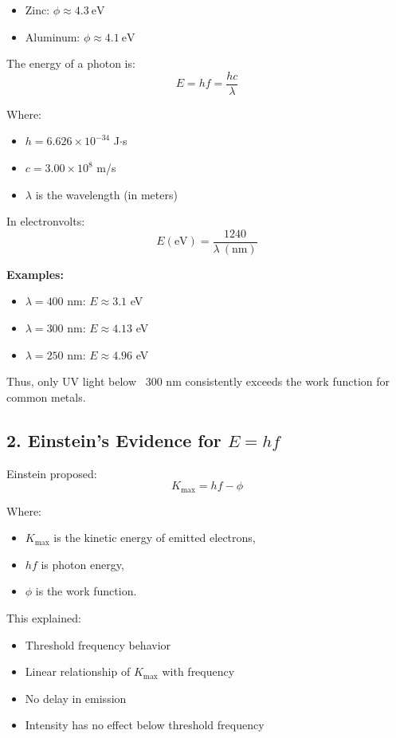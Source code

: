\documentclass[12pt]{article}
\begin{document}
\begin{itemize}
    \item Zinc: $\phi \approx 4.3\ \text{eV}$
    \item Aluminum: $\phi \approx 4.1\ \text{eV}$
\end{itemize}

The energy of a photon is:
\[
E = hf = \frac{hc}{\lambda}
\]

Where:
\begin{itemize}
    \item $h = 6.626 \times 10^{-34}$ J$\cdot$s
    \item $c = 3.00 \times 10^8$ m/s
    \item $\lambda$ is the wavelength (in meters)
\end{itemize}

In electronvolts:
\[
E (\text{eV}) = \frac{1240}{\lambda\ (\text{nm})}
\]

\textbf{Examples:}
\begin{itemize}
    \item $\lambda = 400$ nm: $E \approx 3.1$ eV
    \item $\lambda = 300$ nm: $E \approx 4.13$ eV
    \item $\lambda = 250$ nm: $E \approx 4.96$ eV
\end{itemize}

Thus, only UV light below ~300 nm consistently exceeds the work function for common metals.

\subsection*{2. Einstein's Evidence for $E = hf$}
Einstein proposed:
\[
K_{\text{max}} = hf - \phi
\]

Where:
\begin{itemize}
    \item $K_{\text{max}}$ is the kinetic energy of emitted electrons,
    \item $hf$ is photon energy,
    \item $\phi$ is the work function.
\end{itemize}

This explained:
\begin{itemize}
    \item Threshold frequency behavior
    \item Linear relationship of $K_{\text{max}}$ with frequency
    \item No delay in emission
    \item Intensity has no effect below threshold frequency
\end{itemize}
\end{document}
